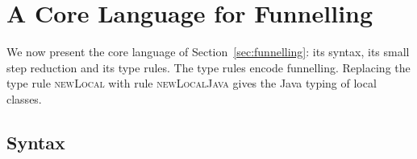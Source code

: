 \section{A Core Language for Funnelling}
\label{sec:core}

We now present the core language of Section~\ref{sec:funnelling}: its syntax, its small step reduction and its type rules.
The type rules encode funnelling.
Replacing the type rule \textsc{newLocal} with rule \textsc{newLocalJava} gives the Java typing of local classes.

\subsection{Syntax}
\label{sec:syntax}
